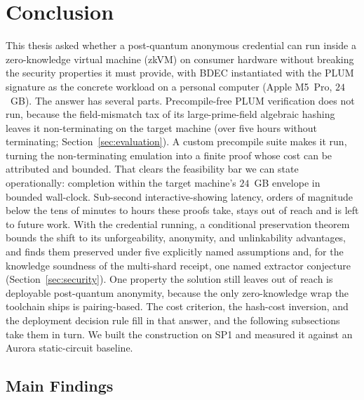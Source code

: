 \section{Conclusion}\label{sec:conclusion}
This thesis asked whether a post-quantum anonymous credential can run inside a zero-knowledge virtual machine (zkVM) on consumer hardware without breaking the security properties it must provide, with BDEC instantiated with the PLUM signature as the concrete workload on a personal computer (Apple M5~Pro, $24$~GB). The answer has several parts. Precompile-free PLUM verification does not run, because the field-mismatch tax of its large-prime-field algebraic hashing leaves it non-terminating on the target machine (over five hours without terminating; Section~\ref{sec:evaluation}). A custom precompile suite makes it run, turning the non-terminating emulation into a finite proof whose cost can be attributed and bounded. That clears the feasibility bar we can state operationally: completion within the target machine's $24$~GB envelope in bounded wall-clock. Sub-second interactive-showing latency, orders of magnitude below the tens of minutes to hours these proofs take, stays out of reach and is left to future work. With the credential running, a conditional preservation theorem bounds the shift to its unforgeability, anonymity, and unlinkability advantages, and finds them preserved under five explicitly named assumptions and, for the knowledge soundness of the multi-shard receipt, one named extractor conjecture (Section~\ref{sec:security}). One property the solution still leaves out of reach is deployable post-quantum anonymity, because the only zero-knowledge wrap the toolchain ships is pairing-based. The cost criterion, the hash-cost inversion, and the deployment decision rule fill in that answer, and the following subsections take them in turn. We built the construction on SP1 and measured it against an Aurora static-circuit baseline.

\subsection{Main Findings}\label{subsec:conclusion-findings}
